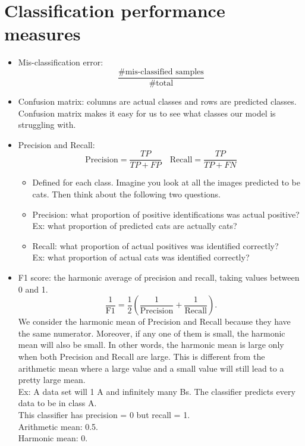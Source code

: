 \documentclass[twoside,12pt]{article}
\begin{document}
\section{Classification performance measures}
\begin{itemize}
\item Mis-classification error: $$\frac{\# \text{mis-classified samples}}{\#\text{total}}$$
\item Confusion matrix: columns are actual classes and rows are predicted classes. Confusion matrix makes it easy for us to see what classes our model is struggling with. 
\item Precision and Recall: $$\text{Precision} = \frac{TP}{TP + FP} \quad \text{Recall} = \frac{TP}{TP + FN}$$
\begin{itemize}
\item Defined for each class. Imagine you look at all the images predicted to be cats. Then think about the following two questions. 
\item Precision: what proportion of positive identifications was actual positive? \\
Ex: what proportion of predicted cats are actually cats?
\item Recall: what proportion of actual positives was identified correctly? \\
Ex: what proportion of actual cats was identified correctly? 
\end{itemize}
\item F1 score: the harmonic average of precision and recall, taking values between 0 and 1. \\
$$\frac{1}{\text{F1}} = \frac 1 2 (\frac{1}{\text{Precision}} + \frac{1}{\text{Recall}}) .$$
We consider the harmonic mean of Precision and Recall because they have the same numerator. Moreover, if any one of them is small, the harmonic mean will also be small. In other words, the harmonic mean is large only when both Precision and Recall are large. This is different from the arithmetic mean where a large value and a small value will still lead to a pretty large mean. \\

Ex: A data set will 1 A and infinitely many Bs. The classifier predicts every data to be in class A. \\
This classifier has precision = 0 but recall = 1. \\
Arithmetic mean: 0.5. \\
Harmonic mean: 0.
\end{itemize}
\end{document}
